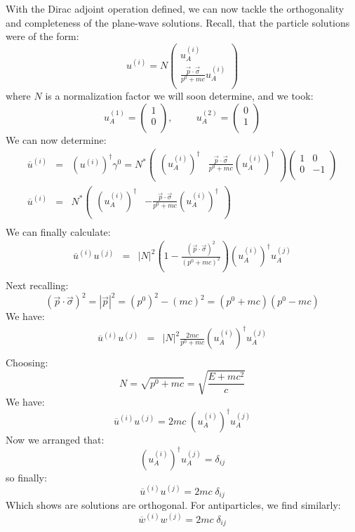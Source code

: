 \documentclass[12pt]{book}
\begin{document}
With the Dirac adjoint operation defined, we can now tackle the orthogonality and completeness of the plane-wave solutions.  Recall, that the particle solutions were of the form:
$$u^{(i)} = N \begin{pmatrix}  \displaystyle u_A^{(i)} \\[5pt] \displaystyle \frac{\vec{p}\cdot\vec{\sigma}}{p^0 + mc} u_A^{(i)}\\ \end{pmatrix}$$
where $N$ is a normalization factor we will soon determine, and we took:
$$u_A^{(1)}=\begin{pmatrix} 1 \\ 0 \\ \end{pmatrix}, \hspace{1cm} u_A^{(2)}=\begin{pmatrix} 0 \\ 1 \\ \end{pmatrix}$$
We can now determine:
\begin{eqnarray*}
\overline{u}^{(i)} &=& (u^{(i)})^\dagger \gamma^0 = 
N^*
\begin{pmatrix} 
\displaystyle (u_A^{(i)})^\dagger & \displaystyle \frac{\vec{p}\cdot\vec{\sigma}}{p^0 + mc} (u_A^{(i)})^\dagger \\
\end{pmatrix}
\begin{pmatrix} 1 & 0 \\ 0 & -1 \\ \end{pmatrix}\\
\overline{u}^{(i)} &=& N^* \begin{pmatrix} 
\displaystyle (u_A^{(i)})^\dagger & \displaystyle -\frac{\vec{p}\cdot\vec{\sigma}}{p^0 + mc} (u_A^{(i)})^\dagger \\
\end{pmatrix} \\
\end{eqnarray*}
We can finally calculate:
\begin{eqnarray*}
\overline{u}^{(i)} u^{(j)} &=& |N|^2 \left( 1 - \frac{(\vec{p}\cdot \vec{\sigma})^2}{(p^0+mc)^2}\right) (u_A^{(i)})^\dagger u_A^{(j)}\\ 
\end{eqnarray*}
Next recalling:
$$(\vec{p}\cdot \vec{\sigma})^2 = |\vec{p}|^2 = (p^0)^2-(mc)^2 = (p^0+mc)(p^0-mc)$$
We have:
\begin{eqnarray*}
\overline{u}^{(i)} u^{(j)} &=& |N|^2 \frac{2mc}{p^0+mc} (u_A^{(i)})^\dagger u_A^{(j)}\\ 
\end{eqnarray*}
Choosing:
$$N = \sqrt{p^0+mc} = \sqrt{\frac{E+mc^2}{c}}$$
We have:
$$\overline{u}^{(i)} u^{(j)} = 2mc \; (u_A^{(i)})^\dagger u_A^{(j)}$$
Now we arranged that:
$$(u_A^{(i)})^\dagger u_A^{(j)} = \delta_{ij}$$
so finally:
$$\overline{u}^{(i)} u^{(j)} = 2mc \; \delta_{ij}$$
Which shows are solutions are orthogonal.  For antiparticles, we find similarly:
$$\overline{w}^{(i)} w^{(j)} = 2mc \; \delta_{ij}$$
\end{document}
